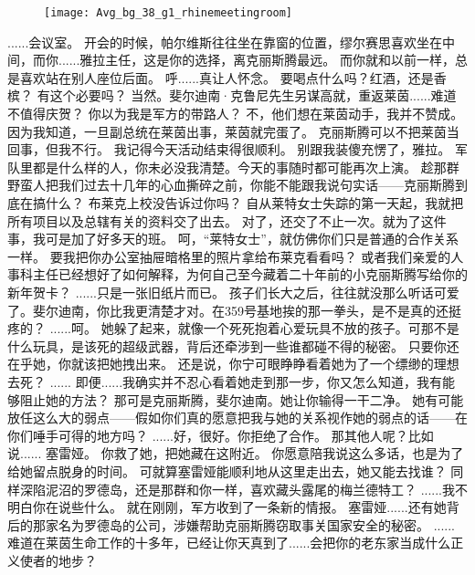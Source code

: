 \documentclass[openany]{book}
\begin{document}
\begin{figure}[h]
    \centering
    \texttt{[image: Avg\_bg\_38\_g1\_rhinemeetingroom]}
\end{figure}
\begin{dialogue}
     ......会议室。
     开会的时候，帕尔维斯往往坐在靠窗的位置，缪尔赛思喜欢坐在中间，而你......雅拉主任，这是你的选择，离克丽斯腾最远。
     而你就和以前一样，总是喜欢站在别人座位后面。
     呼......真让人怀念。
     要喝点什么吗？红酒，还是香槟？
     有这个必要吗？
     当然。斐尔迪南·克鲁尼先生另谋高就，重返莱茵......难道不值得庆贺？
     你以为我是军方的带路人？
     不，他们想在莱茵动手，我并不赞成。因为我知道，一旦副总统在莱茵出事，莱茵就完蛋了。
     克丽斯腾可以不把莱茵当回事，但我不行。
     我记得今天活动结束得很顺利。
     别跟我装傻充愣了，雅拉。
     军队里都是什么样的人，你未必没我清楚。今天的事随时都可能再次上演。
     趁那群野蛮人把我们过去十几年的心血撕碎之前，你能不能跟我说句实话——克丽斯腾到底在搞什么？
     布莱克上校没告诉过你吗？
     自从莱特女士失踪的第一天起，我就把所有项目以及总辖有关的资料交了出去。
     对了，还交了不止一次。就为了这件事，我可是加了好多天的班。
     呵，“莱特女士”，就仿佛你们只是普通的合作关系一样。
     要我把你办公室抽屉暗格里的照片拿给布莱克看看吗？
     或者我们亲爱的人事科主任已经想好了如何解释，为何自己至今藏着二十年前的小克丽斯腾写给你的新年贺卡？
     ......只是一张旧纸片而已。
     孩子们长大之后，往往就没那么听话可爱了。斐尔迪南，你比我更清楚才对。在359号基地挨的那一拳头，是不是真的还挺疼的？
     ......呵。
     她躲了起来，就像一个死死抱着心爱玩具不放的孩子。可那不是什么玩具，是该死的超级武器，背后还牵涉到一些谁都碰不得的秘密。
     只要你还在乎她，你就该把她拽出来。
     还是说，你宁可眼睁睁看着她为了一个缥缈的理想去死？
     ......
     即便......我确实并不忍心看着她走到那一步，你又怎么知道，我有能够阻止她的方法？
     那可是克丽斯腾，斐尔迪南。她让你输得一干二净。
     她有可能放任这么大的弱点——假如你们真的愿意把我与她的关系视作她的弱点的话——在你们唾手可得的地方吗？
     ......好，很好。你拒绝了合作。
     那其他人呢？比如说......
     塞雷娅。
     你救了她，把她藏在这附近。
     你愿意陪我说这么多话，也是为了给她留点脱身的时间。
     可就算塞雷娅能顺利地从这里走出去，她又能去找谁？
     同样深陷泥沼的罗德岛，还是那群和你一样，喜欢藏头露尾的梅兰德特工？
     ......我不明白你在说些什么。
     就在刚刚，军方收到了一条新的情报。
     塞雷娅......还有她背后的那家名为罗德岛的公司，涉嫌帮助克丽斯腾窃取事关国家安全的秘密。
     ......
     难道在莱茵生命工作的十多年，已经让你天真到了......会把你的老东家当成什么正义使者的地步？
\end{dialogue}
\end{document}
